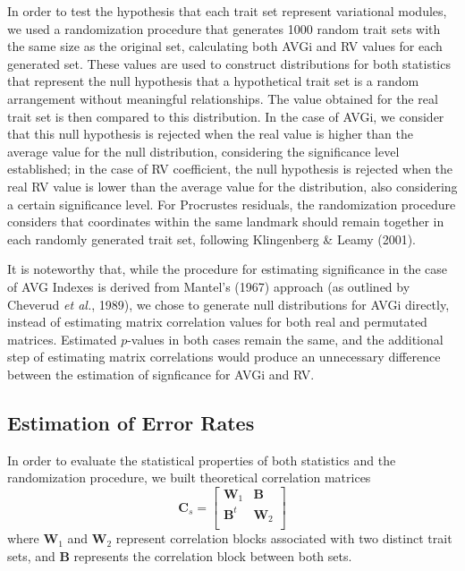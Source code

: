 \documentclass[12pt,]{article}
\begin{document}
In order to test the hypothesis that each trait set represent
variational modules, we used a randomization procedure that generates
1000 random trait sets with the same size as the original set,
calculating both AVGi and RV values for each generated set. These values
are used to construct distributions for both statistics that represent
the null hypothesis that a hypothetical trait set is a random
arrangement without meaningful relationships. The value obtained for the
real trait set is then compared to this distribution. In the case of
AVGi, we consider that this null hypothesis is rejected when the real
value is higher than the average value for the null distribution,
considering the significance level established; in the case of RV
coefficient, the null hypothesis is rejected when the real RV value is
lower than the average value for the distribution, also considering a
certain significance level. For Procrustes residuals, the randomization
procedure considers that coordinates within the same landmark should
remain together in each randomly generated trait set, following
Klingenberg \& Leamy (2001).

It is noteworthy that, while the procedure for estimating significance
in the case of AVG Indexes is derived from Mantel's (1967) approach (as
outlined by Cheverud \emph{et al.}, 1989), we chose to generate null
distributions for AVGi directly, instead of estimating matrix
correlation values for both real and permutated matrices. Estimated
$p$-values in both cases remain the same, and the additional step of
estimating matrix correlations would produce an unnecessary difference
between the estimation of signficance for AVGi and RV.

\subsection{Estimation of Error Rates}\label{estimation-of-error-rates}

In order to evaluate the statistical properties of both statistics and
the randomization procedure, we built theoretical correlation matrices
\[
\mathbf{C}_{s} =
\begin{bmatrix}
\mathbf{W}_1 & \mathbf{B} \\
\mathbf{B}^t & \mathbf{W}_2 \\
\end{bmatrix}
\] where $\mathbf{W}_1$ and $\mathbf{W}_2$ represent correlation blocks
associated with two distinct trait sets, and $\mathbf{B}$ represents the
correlation block between both sets.
\end{document}
